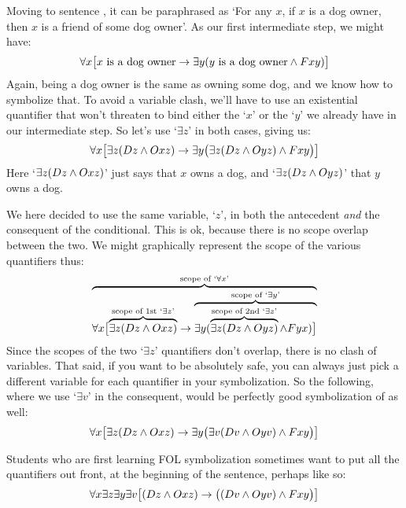 Moving to sentence , it can be paraphrased as `For any $x$, if $x$ is a dog owner, then $x$ is a friend of some dog owner'. As our first intermediate step, we might have:
$$\forall x\bigl[\mbox{$x$ is a dog owner}\rightarrow\exists y(\mbox{$y$ is a dog owner}\wedge Fxy)\bigr]$$
Again, being a dog owner is the same as owning some dog, and we know how to symbolize that.  To avoid a variable clash, we'll have to use an existential quantifier that won't threaten to bind either the `$x$' or the `$y$' we already have in our intermediate step.  So let's use `$\exists z$' in both cases, giving us:
$$\forall x\bigl[\exists z(Dz \wedge Oxz)\rightarrow\exists y\bigl(\exists z(Dz \wedge Oyz)\wedge Fxy\bigr)\bigr]$$
Here `$\exists z(Dz \wedge Oxz)$' just says that $x$ owns a dog, and  `$\exists z(Dz \wedge Oyz)$' that $y$ owns a dog.


We here decided to use the same variable, `$z$', in both the antecedent \emph{and} the consequent of the conditional. This is ok, because there is no scope overlap between the two. We might graphically represent the scope of the various quantifiers thus:
$$\overbrace{\forall x\bigl[\overbrace{\exists z(Dz \wedge Oxz)}^{\text{scope of 1st `}\exists z\text{'}}\rightarrow \overbrace{\exists y(\overbrace{\exists z(Dz \wedge Oyz)}^{\text{scope of 2nd `}\exists z\text{'}}\wedge Fyx)\bigr]}^{\text{scope of `}\exists y\text{'}}}^{\text{scope of `}\forall x\text{'}}$$
Since the scopes of the two `$\exists z$' quantifiers don't overlap, there is no clash of variables.   That said, if you want to be absolutely safe, you can always just pick a different variable for each quantifier in your symbolization.  So the following, where we use `$\exists v$' in the consequent, would be perfectly good symbolization of  as well:
$$\forall x\bigl[\exists z(Dz \wedge Oxz)\rightarrow\exists y\bigl(\exists v(Dv \wedge Oyv)\wedge Fxy\bigr)\bigr]$$

%
Students who are first learning FOL symbolization sometimes want to put all the quantifiers out front, at the beginning of the sentence, perhaps like so:
$$\forall x\exists z \exists y \exists v\bigl[(Dz \wedge Oxz)\rightarrow \bigl((Dv \wedge Oyv)\wedge Fxy\bigr)\bigr]$$

